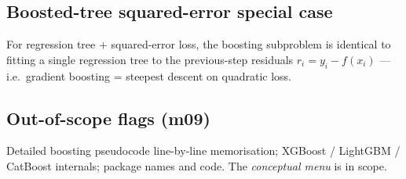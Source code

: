 \subsection{Boosted-tree squared-error special case}
For regression tree + squared-error loss, the boosting subproblem is identical to fitting a single regression tree to the previous-step residuals $r_i = y_i - f(x_i)$ — i.e.\ gradient boosting = steepest descent on quadratic loss.

\subsection{Out-of-scope flags (m09)}
Detailed boosting pseudocode line-by-line memorisation; XGBoost / LightGBM / CatBoost internals; package names and code. The \emph{conceptual menu} is in scope.


